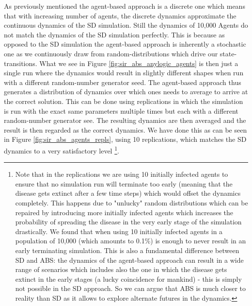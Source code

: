 As previously mentioned the agent-based approach is a discrete one which means that with increasing number of agents, the discrete dynamics approximate the continuous dynamics of the SD simulation. Still the dynamics of 10,000 Agents do not match the dynamics of the SD simulation perfectly. This is because as opposed to the SD simulation the agent-based approach is inherently a stochastic one as we continuously draw from random-distributions which drive our state-transitions. What we see in Figure \ref{fig:sir_abs_anylogic_agents} is then just a single run where the dynamics would result in slightly different shapes when run with a different random-number generator seed. The agent-based approach thus generates a distribution of dynamics over which ones needs to average to arrive at the correct solution. This can be done using replications in which the simulation is run with the exact same parameters multiple times but each with a different random-number generator see. The resulting dynamics are then averaged and the result is then regarded as the correct dynamics.
We have done this as can be seen in Figure \ref{fig:sir_abs_agents_repls}, using 10 replications, which matches the SD dynamics to a very satisfactory level \footnote{Note that in the replications we are using 10 initially infected agents to ensure that no simulation run will terminate too early (meaning that the disease gets extinct after a few time steps) which would offset the dynamics completely. This happens due to "unlucky" random distributions which can be repaired by introducing more initially infected agents which increases the probability of spreading the disease in the very early stage of the simulation drastically. We found that when using 10 initially infected agents in a population of 10,000 (which amounts to 0.1\%) is enough to never result in an early terminating simulation. This is also a fundamental difference between SD and ABS: the dynamics of the agent-based approach can result in a wide range of scenarios which includes also the one in which the disease gets extinct in the early stages (a lucky coincidence for mankind) - this is simply not possible in the SD approach. So we can argue that ABS is much closer to reality than SD as it allows to explore alternate futures in the dynamics.}.

